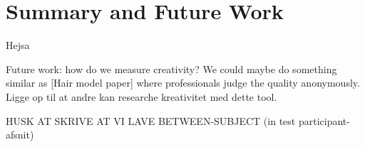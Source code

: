 \section{Summary and Future Work}
Hejsa

Future work: how do we measure creativity? We could maybe do something similar as [Hair model paper] where professionals judge the quality anonymously. Ligge op til at andre kan researche kreativitet med dette tool.

HUSK AT SKRIVE AT VI LAVE BETWEEN-SUBJECT (in test participant-afsnit)